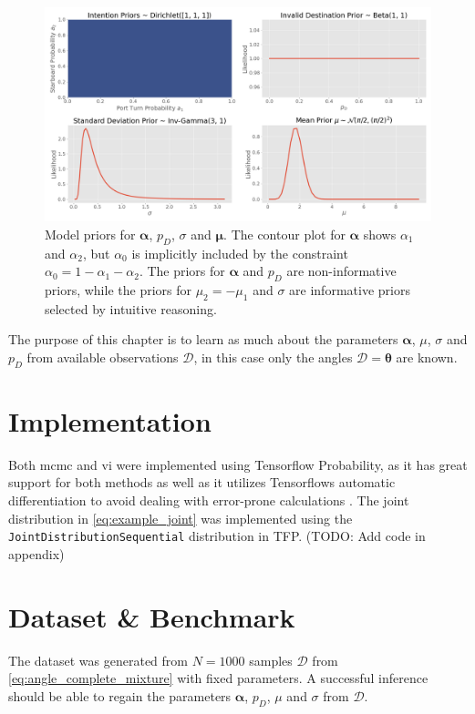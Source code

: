 \begin{figure}
    \centering
    \includegraphics[width=1\textwidth]{figures/priors.png}
    \caption{Model priors for $\boldsymbol{\alpha}$, $p_D$, $\sigma$ and $\boldsymbol{\mu}$. The contour plot for $\boldsymbol{\alpha}$ shows $\alpha_1$ and $\alpha_2$, but $\alpha_0$ is implicitly included by the constraint $\alpha_0 = 1 - \alpha_1 - \alpha_2$. The priors for $\boldsymbol{\alpha}$ and $p_D$ are non-informative priors, while the priors for $\mu_2 = -\mu_1$ and $\sigma$ are informative priors selected by intuitive reasoning.}
    \label{fig:priors}
\end{figure}

The purpose of this chapter is to learn as much about the parameters $\boldsymbol{\alpha}$, $\mu$, $\sigma$ and $p_D$ from available observations $\mathcal{D}$, in this case only the angles $\mathcal{D} = \boldsymbol{\theta}$ are known. 

\section{Implementation}
Both \acrshort{mcmc} and \acrshort{vi} were implemented using Tensorflow Probability, as it has great support for both methods as well as it utilizes Tensorflows automatic differentiation to avoid dealing with error-prone calculations \cite{tensorflow2015-whitepaper}. The joint distribution in \cref{eq:example_joint} was implemented using the \texttt{JointDistributionSequential} distribution in TFP. (TODO: Add code in appendix)


\section{Dataset \& Benchmark}
The dataset was generated from $N=1000$ samples $\mathcal{D}$ from \cref{eq:angle_complete_mixture} with fixed parameters. A successful inference should be able to regain the parameters $\boldsymbol{\alpha}$, $p_D$, $\mu$ and $\sigma$ from $\mathcal{D}$.

